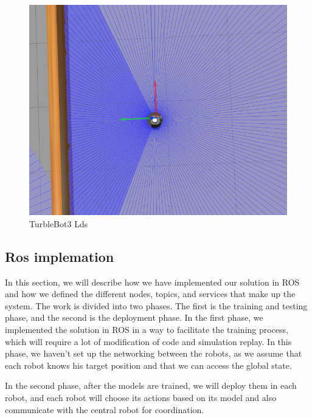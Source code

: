 \documentclass[12pt]{extarticle}
\begin{document}
 \begin{figure}[h]  
\centering
\includegraphics[scale=0.4]{lds.png}
\caption[Lds]{TurbleBot3 Lds}
\end{figure}






 
   











 

\subsection{Ros implemation}
In this section, we will describe how we have implemented our solution in ROS and how we defined the different nodes, topics, and services that make up the system.
The work is divided into two phases. The first is the training and testing phase, and the second is the deployment phase.
In the first phase, we implemented the solution in ROS in a way to facilitate the training process, which will require a lot of modification of code and simulation replay. In this phase, we haven't set up the networking between the robots, as we assume that each robot knows his target position and that we can access the global state.

In the second phase, after the models are trained, we will deploy them in each robot, and each robot will choose its actions based on its model and also communicate with the central robot for coordination.
\end{document}
